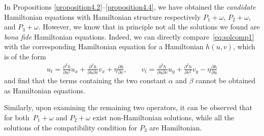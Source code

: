 \documentclass[pdftex]{sigma}
\numberwithin{equation}{section}
\begin{document}
In Propositions \ref{proposition4.2}--\ref{proposition4.4}, we have obtained the \emph{candidate} Hamiltonian equations with Hamiltonian structure respectively $P_1+\omega$, $P_2+\omega$, and $P_3+\omega$. However, we know that in principle not all the solutions we found are \emph{bona fide} Hamiltonian equations. Indeed, we can directly compare~\eqref{eq:solcomp1} with the corresponding Hamiltonian equation for a Hamiltonian $h(u,v)$, which is of the form
\begin{gather*}
u_t=\frac{\partial^2 h}{\partial u^2}u_x+\frac{\partial^2 h}{\partial u\partial v}v_x+\eta\frac{\partial h}{\partial v},\qquad
v_t=\frac{\partial^2 h}{\partial u\partial v}u_y+\frac{\partial^2 h}{\partial v^2}v_y-\eta\frac{\partial h}{\partial u}
\end{gather*}
and find that the terms containing the two constant $\alpha$ and $\beta$ cannot be obtained as Hamiltonian equations.

Similarly, upon examining the remaining two operators, it can be observed that for both~${P_1\!+\!\omega}$ and $P_2+\omega$ exist non-Hamiltonian solutions, while all the solutions of the compatibility condition for $P_3$ are Hamiltonian.
\end{document}
